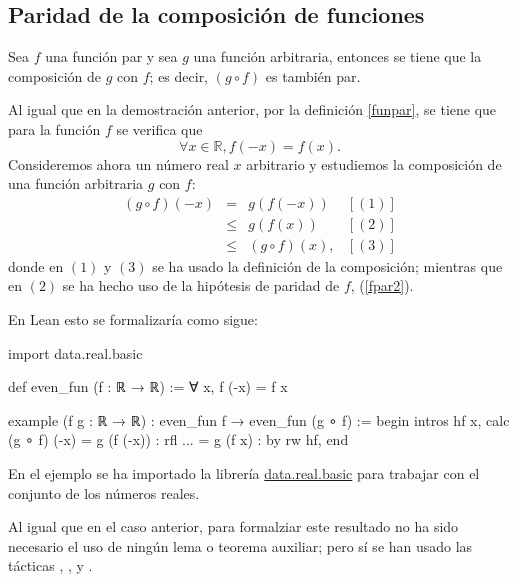 \subsection{Paridad de la composición de funciones}

\begin{teorema}
  Sea \(f\) una función par y sea \(g\) una función arbitraria, entonces
  se tiene que la composición de \(g\) con \(f\); es decir, \((g ∘ f)\)
  es también par.
\end{teorema}

\begin{demostracion}
  Al igual que en la demostración anterior, por la definición
  \ref{funpar}, se tiene que para la función \(f\) se verifica que
  \begin{equation}\label{fpar2}
     ∀ x ∈ ℝ, f(-x) = f(x).
  \end{equation}
  Consideremos ahora un número real \(x\) arbitrario y estudiemos la
  composición de una función arbitraria \(g\) con \(f\):
  \[\begin{array}{llll}
      (g ∘ f)(-x) &= &g(f(-x))    & [(1)]\\
                  &≤ &g(f(x))     & [(2)] \\
                  &≤ &(g ∘ f)(x), & [(3)]
    \end{array}\]
  donde en \((1)\) y \((3)\) se ha usado la definición de la
  composición; mientras que en \((2)\) se ha hecho uso de la hipótesis
  de paridad de \(f\), (\ref{fpar2}).
\end{demostracion}

En Lean esto se formalizaría como sigue:
\begin{leancode}
import data.real.basic

def even_fun (f : ℝ → ℝ) := ∀ x, f (-x) = f x

example (f g : ℝ → ℝ) : even_fun f → even_fun (g ∘ f) :=
begin
  intros hf x,
  calc (g ∘ f) (-x)
      = g (f (-x)) : rfl
  ... = g (f x)    : by rw hf,
end
\end{leancode}

En el ejemplo se ha importado la librería  \href{https://github.com/leanprover-community/mathlib/blob/master/src/data/real/basic.lean}{data.real.basic}
para trabajar con el conjunto de los números reales.

Al igual que en el caso anterior, para formalziar este resultado no ha
sido necesario el uso de ningún lema o teorema auxiliar; pero sí se han
usado las tácticas
,
,
 y
.


